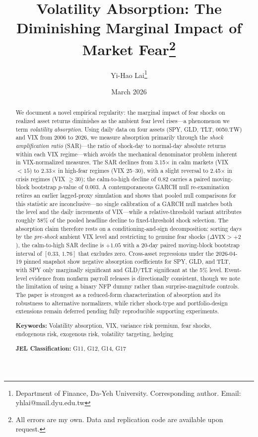 \documentclass[12pt,a4paper]{article}
\title{Volatility Absorption: The Diminishing Marginal Impact of Market Fear\thanks{All errors are my own. Data and replication code are available upon request.}}
\author{Yi-Hao Lai\thanks{Department of Finance, Da-Yeh University. Corresponding author. Email: yhlai@mail.dyu.edu.tw}}
\date{March 2026}
\begin{document}
\maketitle

\begin{abstract}
\noindent
We document a novel empirical regularity: the marginal impact of fear shocks on realized asset returns diminishes as the ambient fear level rises---a phenomenon we term \textit{volatility absorption}. Using daily data on four assets (SPY, GLD, TLT, 0050.TW) and VIX from 2006 to 2026, we measure absorption primarily through the \textit{shock amplification ratio} (SAR)---the ratio of shock-day to normal-day absolute returns within each VIX regime---which avoids the mechanical denominator problem inherent in VIX-normalized measures. The SAR declines from 3.15$\times$ in calm markets (VIX $< 15$) to 2.33$\times$ in high-fear regimes (VIX 25--30), with a slight reversal to 2.45$\times$ in crisis regimes (VIX $\geq 30$); the calm-to-high decline of 0.82 carries a paired moving-block bootstrap $p$-value of 0.003. A contemporaneous GARCH null re-examination retires an earlier lagged-proxy simulation and shows that pooled null comparisons for this statistic are inconclusive---no single calibration of a GARCH null matches both the level and the daily increments of VIX---while a relative-threshold variant attributes roughly 58\% of the pooled headline decline to fixed-threshold shock selection. The absorption claim therefore rests on a conditioning-and-sign decomposition: sorting days by the \textit{pre-shock} ambient VIX level and restricting to genuine fear shocks ($\Delta\text{VIX} > +2$), the calm-to-high SAR decline is $+1.05$ with a 20-day paired moving-block bootstrap interval of $[0.33,\,1.76]$ that excludes zero. Cross-asset regressions under the 2026-04-19 pinned snapshot show negative absorption coefficients for SPY, GLD, and TLT, with SPY only marginally significant and GLD/TLT significant at the 5\% level. Event-level evidence from nonfarm payroll releases is directionally consistent, though we note the limitation of using a binary NFP dummy rather than surprise-magnitude controls. The paper is strongest as a reduced-form characterization of absorption and its robustness to alternative normalizers, while richer shock-type and portfolio-design extensions remain deferred pending fully reproducible supporting experiments.

\medskip
\noindent
\textbf{Keywords:} Volatility absorption, VIX, variance risk premium, fear shocks, endogenous risk, exogenous risk, volatility targeting, hedging

\medskip
\noindent
\textbf{JEL Classification:} G11, G12, G14, G17
\end{abstract}
\end{document}
